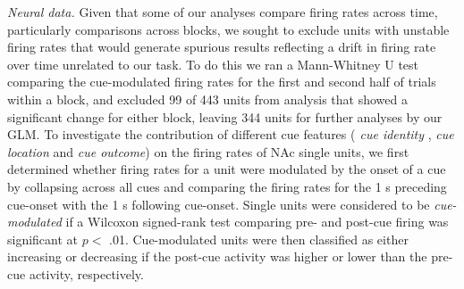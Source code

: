 \documentclass[11pt]{article}
\providecommand{\DIFadd}[1]{{\protect\color{red} \sf #1}} %
\providecommand{\DIFdel}[1]{} %
\providecommand{\DIFaddbegin}{} %
\providecommand{\DIFaddend}{} %
\providecommand{\DIFdelbegin}{} %
\providecommand{\DIFdelend}{} %
\newcommand{\DIFscaledelfig}{0.5}
\newlength{\DIFdelgraphicswidth} %
\newlength{\DIFdelgraphicsheight} %
\newcommand{\DIFaddincludegraphics}[2][]{{\color{red}\fbox{\DIFOincludegraphics[#1]{#2}}}} %
\newcommand{\DIFdelincludegraphics}[2][]{%
\sbox{\DIFdelgraphicsbox}{\DIFOincludegraphics[#1]{#2}}%
\settoboxwidth{\DIFdelgraphicswidth}{\DIFdelgraphicsbox} %
\settoboxtotalheight{\DIFdelgraphicsheight}{\DIFdelgraphicsbox} %
\scalebox{\DIFscaledelfig}{%
\parbox[b]{\DIFdelgraphicswidth}{\usebox{\DIFdelgraphicsbox}\\[-\baselineskip] \rule{\DIFdelgraphicswidth}{0em}}\llap{\resizebox{\DIFdelgraphicswidth}{\DIFdelgraphicsheight}{%
\setlength{\unitlength}{\DIFdelgraphicswidth}%
\begin{picture}(1,1)%
\thicklines\linethickness{2pt} %
{\color[rgb]{1,0,0}\put(0,0){\framebox(1,1){}}}%
{\color[rgb]{1,0,0}\put(0,0){\line( 1,1){1}}}%
{\color[rgb]{1,0,0}\put(0,1){\line(1,-1){1}}}%
\end{picture}%
}\hspace*{3pt}}} %
} %
\DeclareRobustCommand{\DIFaddbegin}{\DIFOaddbegin \let\includegraphics\DIFaddincludegraphics} %
\DeclareRobustCommand{\DIFaddend}{\DIFOaddend \let\includegraphics\DIFOincludegraphics} %
\DeclareRobustCommand{\DIFdelbegin}{\DIFOdelbegin \let\includegraphics\DIFdelincludegraphics} %
\DeclareRobustCommand{\DIFdelend}{\DIFOaddend \let\includegraphics\DIFOincludegraphics} %
\begin{document}
{\it Neural data.} \DIFdelbegin \DIFdel{To }\DIFdelend \DIFaddbegin \DIFadd{Given that some of our analyses compare firing rates across time,
particularly comparisons across blocks, we sought to exclude units
with unstable firing rates that would generate spurious results
reflecting a drift in firing rate over time unrelated to our task. To
do this we ran a Mann-Whitney U test comparing the cue-modulated firing
rates for the first and second half of trials within a block, and
excluded 99 of 443 units from analysis that showed a significant change for
either block, leaving 344 units for further analyses by our GLM. To }\DIFaddend investigate the contribution of different cue
features \DIFaddbegin \DIFadd{(}\DIFaddend {\DIFdelbegin \DIFdel{cue identity and cue outcome}\DIFdelend \DIFaddbegin \it \DIFadd{cue identity}}\DIFadd{, }{\it \DIFadd{cue location}} \DIFadd{and }{\it \DIFadd{cue outcome}}\DIFaddend ) on the firing rates of NAc
single units, we first determined whether firing rates for a unit
were modulated by the onset of a cue by collapsing across all cues
and comparing the firing rates for the 1 s preceding cue-onset with
the 1 s following cue-onset. Single units were considered to be {\it
cue-modulated} if a Wilcoxon signed-rank test comparing pre- and
post-cue firing was significant at $p <$ .01. Cue-modulated units
were then classified as either increasing or decreasing if the
post-cue activity was higher or lower than the pre-cue activity,
respectively.
\end{document}
